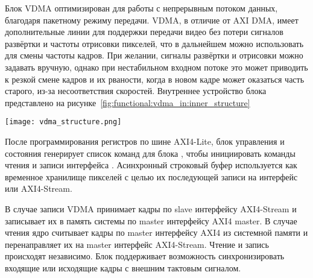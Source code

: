 Блок VDMA оптимизирован для работы с непрерывным потоком данных, благодаря пакетному режиму передачи.
VDMA, в отличие от AXI DMA, имеет дополнительные линии для поддержки передачи видео без потери
сигналов развёртки и частоты отрисовки пикселей, что в дальнейшем можно использовать для смены частоты кадров.
При желании, сигналы развёртки и отрисовки можно задавать вручную, однако при нестабильном входном
потоке это может приводить к резкой смене кадров и их рваности, когда в новом кадре может оказаться
часть старого, из-за несоответствия скоростей.
Внутреннее устройство блока представлено на рисунке~\ref{fig:functional:vdma_in:inner_structure}

\begin{center}
  \centering
  \texttt{[image: vdma\_structure.png]}
  \label{fig:functional:vdma_in:inner_structure}
\end{center}

После программирования регистров по шине AXI4-Lite, блок управления и состояния генерирует список команд
для блока , чтобы инициировать команды чтения и записи интерфейса .
Асинхронный строковый буфер используется как временное хранилище пикселей с целью их последующей
записи на интерфейс  или AXI4-Stream.

В случае записи VDMA принимает кадры по slave интерфейсу AXI4-Stream и записывает
их в память системы по master интерфейсу AXI4 master. В случае чтения ядро считывает
кадры по master интерфейсу AXI4 из системной памяти и перенаправляет их на master интерфейс
AXI4-Stream. Чтение и запись происходят независимо. Блок поддерживает возможность синхронизировать
входящие или исходящие кадры с внешним тактовым сигналом.

